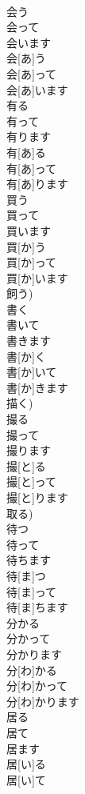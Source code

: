 \documentclass[8pt]{extreport}
\begin{document}
\begin{CJK}{UTF8}{min}
\\	会う 
\\	会って 
\\	会います	
\\	会[あ]う 
\\	会[あ]って 
\\	会[あ]います	
\\	有る 
\\	有って 
\\	有ります	
\\	有[あ]る 
\\	有[あ]って 
\\	有[あ]ります	
\\	買う 
\\	買って 
\\	買います	
\\	買[か]う 
\\	買[か]って 
\\	買[か]います 
\\	飼う)	
\\	書く 
\\	書いて 
\\	書きます	
\\	書[か]く 
\\	書[か]いて 
\\	書[か]きます 
\\	描く)	
\\	撮る 
\\	撮って 
\\	撮ります	
\\	撮[と]る 
\\	撮[と]って 
\\	撮[と]ります 
\\	取る)	
\\	待つ 
\\	待って 
\\	待ちます	
\\	待[ま]つ 
\\	待[ま]って 
\\	待[ま]ちます	
\\	分かる 
\\	分かって 
\\	分かります	
\\	分[わ]かる 
\\	分[わ]かって 
\\	分[わ]かります	
\\	居る 
\\	居て 
\\	居ます	
\\	居[い]る 
\\	居[い]て 

\end{CJK}
\end{document}
